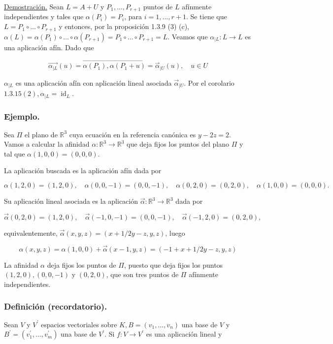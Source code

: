 \documentclass[12pt, a4paper, ones, notitlepage, openany,titlepage]{article}
\begin{document}
\underline{Demostración.} Sean $L=A+U$ y $P_{1}, \ldots, P_{r+1}$ puntos de $L$ afínmente independientes y tales que $\alpha\left(P_{i}\right)=P_{i}$, para $i=1, \ldots, r+1$. Se tiene que $L=P_{1} \circ \ldots \circ P_{r+1}$ y entonces, por la proposición 1.3.9 (3) (c), $\alpha(L)=\alpha\left(P_{1}\right) \circ \ldots \circ \alpha\left(P_{r+1}\right)=P_{1} \circ \ldots \circ P_{r+1}=L$. Veamos que $\alpha_{\mid L}: L \rightarrow L$ es una aplicación afín. Dado que

$$
\overrightarrow{\alpha_{\mid L}}(u)=\overrightarrow{\alpha\left(P_{1}\right), \alpha\left(P_{1}+u\right)}=\vec{\alpha}_{\mid U}(u), \quad u \in U
$$

$\alpha_{\mid L}$ es una aplicación afín con aplicación lineal asociada $\vec{\alpha}_{\mid U}$. Por el corolario $1.3 .15(2), \alpha_{\mid L}=\operatorname{id}_{L}$.

\subsubsection{Ejemplo.} Sea $\Pi$ el plano de $\mathbb{R}^{3}$ cuya ecuación en la referencia canónica es $y-2 z=2$. Vamos a calcular la afinidad $\alpha: \mathbb{R}^{3} \rightarrow \mathbb{R}^{3}$ que deja fijos los puntos del plano $\Pi$ y tal que $\alpha(1,0,0)=(0,0,0)$.

La aplicación buscada es la aplicación afín dada por

$$
\alpha(1,2,0)=(1,2,0), \quad \alpha(0,0,-1)=(0,0,-1), \quad \alpha(0,2,0)=(0,2,0), \quad \alpha(1,0,0)=(0,0,0) .
$$

Su aplicación lineal asociada es la aplicación $\vec{\alpha}: \mathbb{R}^{3} \rightarrow \mathbb{R}^{3}$ dada por

$$
\vec{\alpha}(0,2,0)=(1,2,0), \quad \vec{\alpha}(-1,0,-1)=(0,0,-1), \quad \vec{\alpha}(-1,2,0)=(0,2,0),
$$

equivalentemente, $\vec{\alpha}(x, y, z)=(x+1 / 2 y-z, y, z)$, luego

$$
\alpha(x, y, z)=\alpha(1,0,0)+\vec{\alpha}(x-1, y, z)=(-1+x+1 / 2 y-z, y, z)
$$

La afinidad $\alpha$ deja fijos los puntos de $\Pi$, puesto que deja fijos los puntos $(1,2,0),(0,0,-1)$ y $(0,2,0)$, que son tres puntos de $\Pi$ afínmente independientes.

\subsubsection{Definición (recordatorio).} Sean $V$ y $V^{\prime}$ espacios vectoriales sobre $K, B=\left(v_{1}, \ldots, v_{n}\right)$ una base de $V$ y $B^{\prime}=\left(v_{1}^{\prime}, \ldots, v_{m}^{\prime}\right)$ una base de $V^{\prime}$. Si $f: V \rightarrow V^{\prime}$ es una aplicación lineal y
\end{document}
